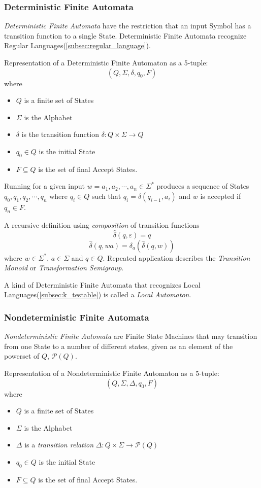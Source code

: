 \documentclass{article}
\begin{document}
\subsubsection{Deterministic Finite Automata}\label{subsec:dfa}
\emph{Deterministic Finite Automata} have the restriction that an
input Symbol has a transition function to a single State.
Deterministic Finite Automata recognize Regular
Languages(\ref{subsec:regular_language}).

Representation of a Deterministic Finite Automaton as a 5-tuple:
\[
    (Q,\Sigma,\delta,q_0,F)
\]
where
\begin{itemize}
\item $Q$ is a finite set of States
\item $\Sigma$ is the Alphabet
\item $\delta$ is the transition function $\delta: Q \times
  \Sigma \rightarrow Q$
\item $q_0 \in Q$ is the initial State
\item $F \subseteq Q$ is the set of final Accept States.
\end{itemize}

Running for a given input $w = a_1,a_2, \cdots , a_n \in \Sigma^*$
produces a sequence of States $q_0,q_1,q_2,\cdots , q_n$ where $q_i
\in Q$ such that $q_i = \delta (q_{i-1},a_i)$ and $w$ is accepted if
$q_n \in F$.

A recursive definition using \emph{composition} of transition
functions
\[
    \widehat{\delta}(q,\varepsilon) = q
\]\[
    \widehat{\delta}(q,wa) = \delta_a(\widehat{\delta}(q,w))
\]
where $w \in \Sigma^*$, $a \in \Sigma$ and $q \in Q$. Repeated
application describes the \emph{Transition Monoid} or
\emph{Transformation Semigroup}.

A kind of Deterministic Finite Automata that recognizes Local
Languages(\ref{subsec:k_testable}) is called a \emph{Local Automaton}.

\subsubsection{Nondeterministic Finite Automata}\label{subsec:ndfa}
\emph{Nondeterministic Finite Automata} are Finite State Machines that
may transition from one State to a number of different states, given
as an element of the powerset of $Q$, $\mathcal{P}(Q)$.

Representation of a Nondeterministic Finite Automaton as a
5-tuple:
\[
    (Q,\Sigma,\Delta,q_0,F)
\]
where
\begin{itemize}
\item $Q$ is a finite set of States
\item $\Sigma$ is the Alphabet
\item $\Delta$ is a \emph{transition relation} $\Delta: Q \times
  \Sigma \rightarrow \mathcal{P}(Q)$
\item $q_0 \in Q$ is the initial State
\item $F \subseteq Q$ is the set of final Accept States.
\end{itemize}
\end{document}

